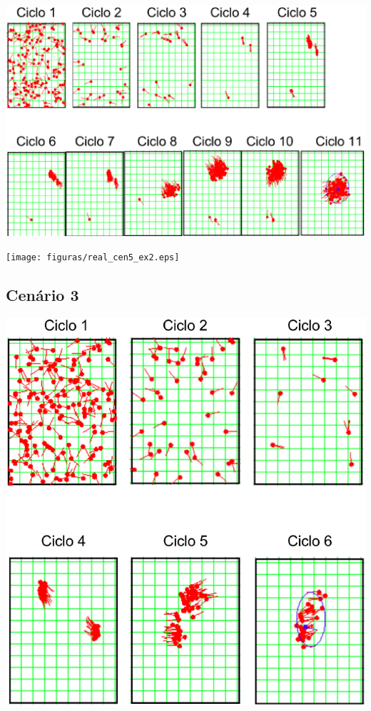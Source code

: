 {\centering
\includegraphics[scale=0.4]{figuras/cen5_ex2.eps}
\label{img:cen5_ex2}
\par}

{\centering
\texttt{[image: figuras/real\_cen5\_ex2.eps]}
\label{img:real_cen5_ex2}
\par}

\subsection{Cenário 3}

{\centering
\includegraphics[scale=0.4]{figuras/cen5_ex3.eps}
\label{img:cen5_ex3}
\par}

